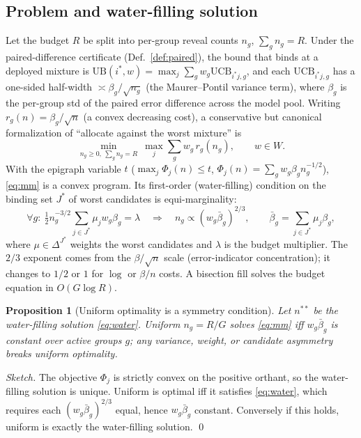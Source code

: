 \documentclass{article}
\newtheorem{proposition}{Proposition}
\begin{document}
\subsection{Problem and water-filling solution}
Let the budget $R$ be split into per-group reveal counts $n_g$, $\sum_g n_g=R$. Under the
paired-difference certificate (Def.~\ref{def:paired}), the bound that binds at a deployed
mixture is $\mathrm{UB}(i^*,w)=\max_j \sum_g w_g \mathrm{UCB}_{i^*j,g}$, and each
$\mathrm{UCB}_{i^*j,g}$ has a one-sided half-width $\asymp \beta_g/\sqrt{n_g}$ (the
Maurer--Pontil variance term), where $\beta_g$ is the per-group std of the paired error
difference across the model pool. Writing $r_g(n)=\beta_g/\sqrt n$ (a convex decreasing
cost), a conservative but canonical formalization of ``allocate against the worst mixture''
is
\begin{equation}
  \min_{n_g\ge0,\ \sum_g n_g=R}\ \max_j\sum_g w_g\,r_g(n_g),\qquad w\in W.\label{eq:mm}
\end{equation}
With the epigraph variable $t$ ($\max_j\Phi_j(n)\le t$, $\Phi_j(n)=\sum_g w_g\beta_g n_g^{-1/2}$),
\eqref{eq:mm} is a convex program. Its first-order (water-filling) condition on the binding
set $J^*$ of worst candidates is equi-marginality:
\begin{equation}
  \forall g:\ \tfrac12 n_g^{-3/2}\sum_{j\in J^*}\mu_j w_g\beta_g=\lambda
  \quad\Longrightarrow\quad
  n_g \propto (w_g\bar\beta_g)^{2/3},\qquad
  \bar\beta_g=\sum_{j\in J^*}\mu_j\beta_g,
  \label{eq:water}
\end{equation}
where $\mu\in\Delta^{J^*}$ weights the worst candidates and $\lambda$ is the budget multiplier.
The $2/3$ exponent comes from the $\beta/\sqrt n$ scale (error-indicator concentration); it
changes to $1/2$ or $1$ for $\log$ or $\beta/n$ costs. A bisection fill solves the budget
equation in $O(G\log R)$.

\begin{proposition}[Uniform optimality is a symmetry condition]
\label{prop:uniform-opt}
Let $n^{**}$ be the water-filling solution \eqref{eq:water}. Uniform
$n_g=R/G$ solves \eqref{eq:mm} iff $w_g\bar\beta_g$ is constant over active groups $g$; any
variance, weight, or candidate asymmetry breaks uniform optimality.
\end{proposition}
\begin{proof}[Sketch]
The objective $\Phi_j$ is strictly convex on the positive orthant, so the water-filling
solution is unique. Uniform is optimal iff it satisfies \eqref{eq:water}, which requires
each $(w_g\bar\beta_g)^{2/3}$ equal, hence $w_g\bar\beta_g$ constant. Conversely if this
holds, uniform is exactly the water-filling solution. \qed
\end{proof}
\end{document}
